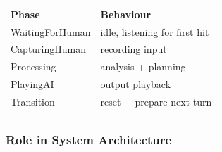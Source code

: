 {\def\LTcaptype{none} %
\begin{longtable}[]{@{}
  >{\raggedright\arraybackslash}p{}
  >{\raggedright\arraybackslash}p{}@{}}
\toprule\noalign{}
\begin{minipage}[b]{\linewidth}\centering
\textbf{Phase}
\end{minipage} & \begin{minipage}[b]{\linewidth}\centering
\textbf{Behaviour}
\end{minipage} \\
\begin{minipage}[b]{\linewidth}\raggedright
WaitingForHuman
\end{minipage} & \begin{minipage}[b]{\linewidth}\raggedright
idle, listening for first hit
\end{minipage} \\
\begin{minipage}[b]{\linewidth}\raggedright
CapturingHuman
\end{minipage} & \begin{minipage}[b]{\linewidth}\raggedright
recording input
\end{minipage} \\
\begin{minipage}[b]{\linewidth}\raggedright
Processing
\end{minipage} & \begin{minipage}[b]{\linewidth}\raggedright
analysis + planning
\end{minipage} \\
\begin{minipage}[b]{\linewidth}\raggedright
PlayingAI
\end{minipage} & \begin{minipage}[b]{\linewidth}\raggedright
output playback
\end{minipage} \\
\begin{minipage}[b]{\linewidth}\raggedright
Transition
\end{minipage} & \begin{minipage}[b]{\linewidth}\raggedright
reset + prepare next turn
\end{minipage} \\
\midrule\noalign{}
\endhead
\bottomrule\noalign{}
\endlastfoot
\end{longtable}
}

\subsubsection{Role in System
Architecture}\label{role-in-system-architecture-1}

